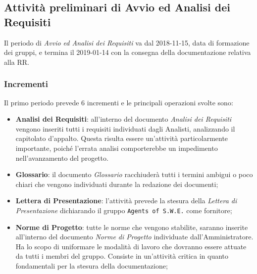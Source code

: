 \subsection{Attività preliminari di Avvio ed Analisi dei Requisiti}
\label{Apaar}

Il periodo di \textit{Avvio ed Analisi dei Requisiti} va dal 2018-11-15, data di formazione dei gruppi, e termina il 2019-01-14 con la consegna della documentazione relativa alla RR.

\newpage
\subsubsection{Incrementi}

Il primo periodo prevede 6 incrementi e le principali operazioni svolte sono: 
\begin{itemize}
	\item \textbf{Analisi dei Requisiti}: all'interno del documento \textit{Analisi dei Requisiti} vengono inseriti tutti i requisiti individuati dagli Analisti, analizzando il capitolato d'appalto. Questa risulta essere un'attività particolarmente importante, poiché l'errata analisi comporterebbe un impedimento nell'avanzamento del progetto.
	\item \textbf{Glossario}: il documento \textit{Glossario} racchiuderà tutti i termini ambigui o poco chiari che vengono individuati durante la redazione dei documenti;
	\item \textbf{Lettera di Presentazione}: l'attività prevede la stesura della \textit{Lettera di Presentazione} dichiarando il gruppo \texttt{Agents of S.W.E.} come fornitore;
	
	\item \textbf{Norme di Progetto}: tutte le norme che vengono stabilite, saranno inserite all'interno del documento \textit{Norme di Progetto} individuate dall'Amministratore. Ha lo scopo di uniformare le modalità di lavoro che dovranno essere attuate da tutti i membri del gruppo. Consiste in un'attività critica in quanto fondamentali per la stesura della documentazione;
	

\end{itemize}
